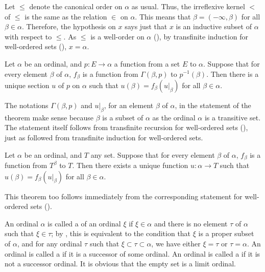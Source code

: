 \documentclass{article}
\begin{document}
Let \(\leq\) denote the canonical order on \(\alpha\) as usual.  Thus,
the irreflexive kernel \(<\) of \(\leq\) is the same as the relation
\(\in\) on \(\alpha\).  This means that \(\beta = (-\infty, \beta)\)
for all \(\beta \in \alpha\).  Therefore, the hypothesis on \(x\) says
just that \(x\) is an inductive subset of \(\alpha\) with respect to
\(\leq\).  As \(\leq\) is a well-order on \(\alpha\)
(), by transfinite induction for well-ordered sets
(), \(x = \alpha\).

\begin{theorem}
  \label{thm:fa9kx7s9}
  Let \(\alpha\) be an ordinal, and \(p : E \to \alpha\) a function
  from a set \(E\) to \(\alpha\).  Suppose that for every element
  \(\beta\) of \(\alpha\), \(f_\beta\) is a function from
  \(\Gamma(\beta, p)\) to \(p^{-1}(\beta)\).  Then there is a unique
  section \(u\) of \(p\) on \(\alpha\) such that
  \(u(\beta) = f_\beta(u \vert_\beta)\) for all \(\beta \in \alpha\).
\end{theorem}

The notations \(\Gamma(\beta, p)\) and \(u \vert_\beta\), for an
element \(\beta\) of \(\alpha\), in the statement of the theorem make
sense because \(\beta\) is a subset of \(\alpha\) as the ordinal
\(\alpha\) is a transitive set.  The statement itself follows from
transfinite recursion for well-ordered sets (),
just as  followed from transfinite induction for
well-ordered sets.

\begin{theorem}
  \label{thm:3y2h6l46}
  Let \(\alpha\) be an ordinal, and \(T\) any set.  Suppose that for
  every element \(\beta\) of \(\alpha\), \(f_\beta\) is a function
  from \(T^\beta\) to \(T\).  Then there exists a unique function
  \(u : \alpha \to T\) such that \(u(\beta) = f_\beta(u \vert_\beta)\)
  for all \(\beta \in \alpha\).
\end{theorem}

This theorem too follows immediately from the corresponding statement
for well-ordered sets ().

An ordinal \(\alpha\) is called a  of an ordinal
\(\xi\) if \(\xi \in \alpha\) and there is no element \(\tau\) of
\(\alpha\) such that \(\xi \in \tau\); by , this is
equivalent to the condition that \(\xi\) is a proper subset of
\(\alpha\), and for any ordinal \(\tau\) such that
\(\xi \subset \tau \subset \alpha\), we have either \(\xi = \tau\) or
\(\tau = \alpha\).  An ordinal is called a  if it is a successor of some ordinal.  An ordinal is called
a  if it is not a successor ordinal.  It is
obvious that the empty set is a limit ordinal.
\end{document}
